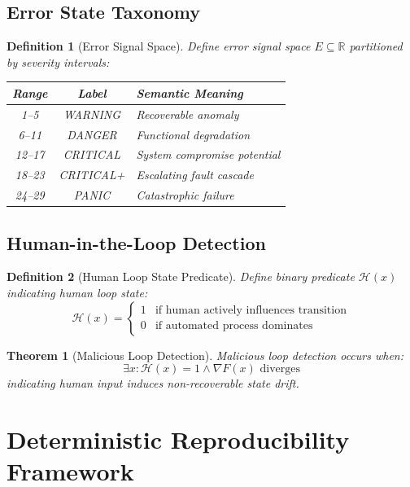 \documentclass[12pt,a4paper]{article}
\newtheorem{theorem}{Theorem}
\newtheorem{definition}{Definition}
\begin{document}
\subsection{Error State Taxonomy}

\begin{definition}[Error Signal Space]
Define error signal space $E \subseteq \mathbb{R}$ partitioned by severity intervals:

\begin{center}
\begin{tabular}{|c|c|l|}
\hline
Range & Label & Semantic Meaning \\
\hline
1--5 & WARNING & Recoverable anomaly \\
6--11 & DANGER & Functional degradation \\
12--17 & CRITICAL & System compromise potential \\
18--23 & CRITICAL+ & Escalating fault cascade \\
24--29 & PANIC & Catastrophic failure \\
\hline
\end{tabular}
\end{center}
\end{definition}

\subsection{Human-in-the-Loop Detection}

\begin{definition}[Human Loop State Predicate]
Define binary predicate $\mathcal{H}(x)$ indicating human loop state:
\[\mathcal{H}(x) = \begin{cases}
1 & \text{if human actively influences transition} \\
0 & \text{if automated process dominates}
\end{cases}\]
\end{definition}

\begin{theorem}[Malicious Loop Detection]
Malicious loop detection occurs when:
\[\exists x : \mathcal{H}(x) = 1 \wedge \nabla F(x) \text{ diverges}\]
indicating human input induces non-recoverable state drift.
\end{theorem}

\section{Deterministic Reproducibility Framework}
\end{document}
